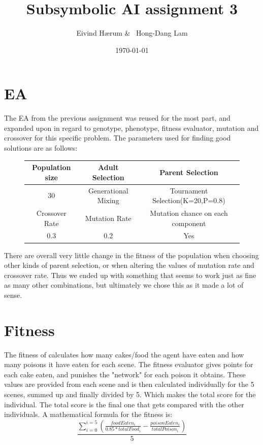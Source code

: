 \documentclass[12pt, a4paper]{article}
\title{Subsymbolic AI assignment 3}
\author{Eivind Hærum \& \ Hong-Dang Lam}
\date{\today} %
\begin{document}
\maketitle
% 
% 
\newpage

\tableofcontents
{}
\newpage

\section{EA}

The EA from the previous assignment was reused for the most part, and expanded upon in regard to genotype, phenotype, fitness evaluator, mutation and crossover for this specific problem. 
The parameters used for finding good solutions are as follows:

\begin{figure}[H]
	\begin{center}
	\begin{tabular}{c|c|c}
		Population size & Adult Selection & Parent Selection \\
		\hline
		30 & Generational Mixing  & Tournament Selection(K=20,P=0.8) \\
		\hline
		\hline
		Crossover Rate & Mutation Rate & Mutation chance on each component\\
		\hline
		0.3 & 0.2 & Yes\\
	\end{tabular}
	\end{center}
\end{figure}

There are overall very little change in the fitness of the population when choosing other kinds of parent selection, or when altering the values of mutation rate and crossover rate. Thus we ended up with something that seems to work just as fine as many other combinations, but ultimately we chose this as it made a lot of sense.


\section{Fitness}
The fitness of calculates how many cakes/food the agent have eaten and how many poisons it have eaten for each scene. The fitness evaluator gives points for each cake eaten, and punishes the "network" for each poison it obtains. These values are provided from each scene and is then calculated individually for the 5 scenes, summed up and finally divided by 5. Which makes the total score for the individual. The total score is the final one that gets compared with the other individuals.
A mathematical formula for the fitness is:
$$ \frac{\sum_{i=0}^{i =5}({\frac{foodEaten_i}{0.85 * totalFood_i} - \frac{poisonEaten_i}{totalPoison_i}})}{5} $$
\end{document}
